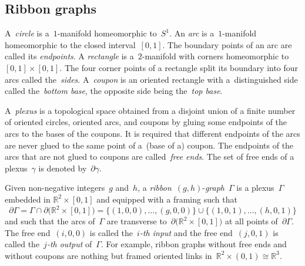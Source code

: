 \documentclass[10pt,a4paper]{amsart}
\numberwithin{equation}{section}
\newcommand{\R}{\mathbb{R}}
\begin{document}
\subsection{Ribbon graphs} \label{ribbongrph}
A~\emph{circle} is a~$1$-manifold homeomorphic to~$S^1$. An \emph{arc} is a~$1$-manifold homeomorphic to the closed interval~$[0,1]$.
The boundary points of an arc are called its \emph{endpoints}.
A \emph{rectangle} is a~$2$-manifold with corners homeomorphic to~$[0,1] \times [0,1]$. The four corner points of a rectangle split its boundary into four arcs called the~\emph{sides}. A~\emph{coupon} is an oriented rectangle with a~distinguished side called the~\emph{bottom base}, the opposite side being the~\emph{top base}.

A~\emph{plexus} is a topological space obtained from a disjoint
union of a finite number of oriented circles, oriented arcs, and coupons
by gluing some endpoints of the arcs to the bases of the coupons. It is required that different endpoints of the arcs are never glued to the same point of a~(base of a) coupon. The endpoints of the arcs that are not glued to coupons are called~\emph{free ends}. The set of free ends of a plexus~$\gamma$ is denoted by~$\partial \gamma$.

Given non-negative integers~$g$ and~$h$, a \textit{ribbon}~$(g,h)$-\textit{graph}~$\Gamma$ is a plexus~$\Gamma$ embedded in ${\R^2 \times [0,1]}$ and equipped with a framing such that
\[
\partial \Gamma=\Gamma\cap \partial \bigl(\R^2 \times [0,1]\bigr) =\{(1,0,0), \dots, (g,0,0)\} \cup \{(1,0,1), \dots, (h,0,1)\}
\]
and such that the arcs of~$\Gamma$ are transverse to~$\partial \bigl(\R^2 \times [0,1]\bigr)$ at all points of~$ \partial \Gamma$.
The free end~$(i,0,0)$ is called the~\emph{$i$-th input} and the free end~$(j,0,1)$ is called the~\emph{$j$-th output} of~$\Gamma$.
For example, ribbon graphs without free ends and without coupons are nothing but framed oriented links in~$\R^2 \times (0,1) \cong \R^3$.
\end{document}
